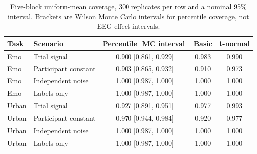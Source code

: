 \begin{table}[ht]\centering\small
\caption{Five-block uniform-mean coverage, 300 replicates per row and a nominal 95\% interval. Brackets are Wilson Monte Carlo intervals for percentile coverage, not EEG effect intervals.}
\begin{tabular}{llccc}\toprule
Task & Scenario & Percentile [MC interval] & Basic & t-normal\\\midrule
Emo & Trial signal & 0.900 [0.861, 0.929] & 0.983 & 0.990\\
Emo & Participant constant & 0.903 [0.865, 0.932] & 0.910 & 0.973\\
Emo & Independent noise & 1.000 [0.987, 1.000] & 1.000 & 1.000\\
Emo & Labels only & 1.000 [0.987, 1.000] & 1.000 & 1.000\\
Urban & Trial signal & 0.927 [0.891, 0.951] & 0.977 & 0.993\\
Urban & Participant constant & 0.970 [0.944, 0.984] & 0.920 & 0.977\\
Urban & Independent noise & 1.000 [0.987, 1.000] & 1.000 & 1.000\\
Urban & Labels only & 1.000 [0.987, 1.000] & 1.000 & 1.000\\
\bottomrule\end{tabular}
\end{table}
